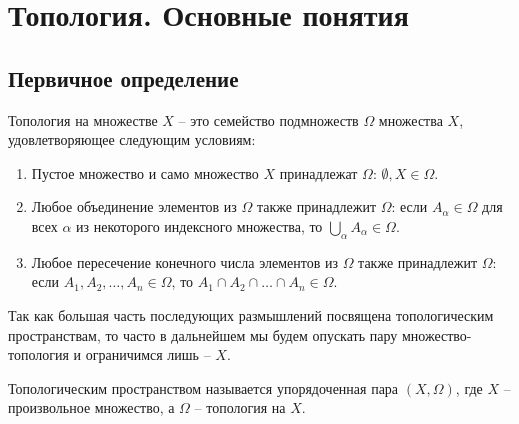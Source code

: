 \section{Топология. Основные понятия}
\subsection{Первичное определение}
\begin{definition}[Топология]
	Топология на множестве $X$ -- это семейство подмножеств $\Omega$ множества $X$, удовлетворяющее следующим условиям:
	\begin{enumerate}
		\item Пустое множество и само множество $X$ принадлежат $\Omega$: $\emptyset, X \in \Omega$.
		\item Любое объединение элементов из $\Omega$ также принадлежит $\Omega$: если $A_\alpha \in \Omega$ для всех $\alpha$ из некоторого индексного множества, то $\bigcup_\alpha A_\alpha \in \Omega$.
		\item Любое пересечение конечного числа элементов из $\Omega$ также принадлежит $\Omega$: если $A_1, A_2, \ldots, A_n \in \Omega$, то $A_1 \cap A_2 \cap \ldots \cap A_n \in \Omega$.
	\end{enumerate}
\end{definition}

Так как большая часть последующих размышлений посвящена топологическим пространствам, то часто в дальнейшем мы будем опускать пару множество-топология и ограничимся лишь -- $X$.

\begin{definition}
	Топологическим пространством называется упорядоченная пара $(X, \Omega)$, где $X$ -- произвольное множество, а $\Omega$ -- топология на $X$.
\end{definition}

